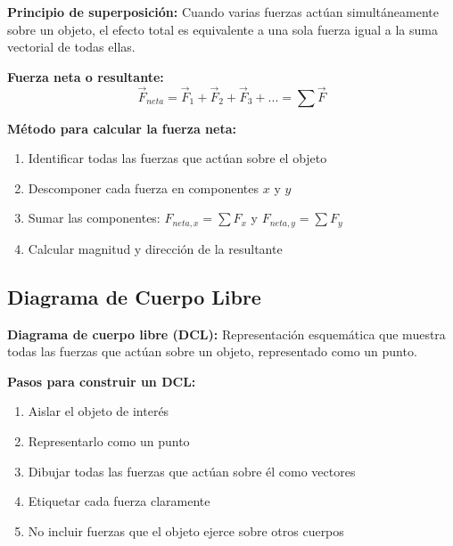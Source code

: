 \begin{seccion}
\begin{definicion}
    \textbf{Principio de superposición:} Cuando varias fuerzas actúan simultáneamente sobre un objeto, el efecto total es equivalente a una sola fuerza igual a la suma vectorial de todas ellas.
\end{definicion}

\begin{ecuacion}
\textbf{Fuerza neta o resultante:}
$$\vec{F}_{neta} = \vec{F}_1 + \vec{F}_2 + \vec{F}_3 + ... = \sum \vec{F}$$
\end{ecuacion}

\textbf{Método para calcular la fuerza neta:}
\begin{enumerate}
    \item Identificar todas las fuerzas que actúan sobre el objeto
    \item Descomponer cada fuerza en componentes $x$ y $y$
    \item Sumar las componentes: $F_{neta,x} = \sum F_x$ y $F_{neta,y} = \sum F_y$
    \item Calcular magnitud y dirección de la resultante
\end{enumerate}
\end{seccion}

\subsection{Diagrama de Cuerpo Libre}

\begin{seccion}
\begin{definicion}
    \textbf{Diagrama de cuerpo libre (DCL):} Representación esquemática que muestra todas las fuerzas que actúan sobre un objeto, representado como un punto.
\end{definicion}

\textbf{Pasos para construir un DCL:}
\begin{enumerate}
    \item Aislar el objeto de interés
    \item Representarlo como un punto
    \item Dibujar todas las fuerzas que actúan sobre él como vectores
    \item Etiquetar cada fuerza claramente
    \item No incluir fuerzas que el objeto ejerce sobre otros cuerpos
\end{enumerate}
\end{seccion}

